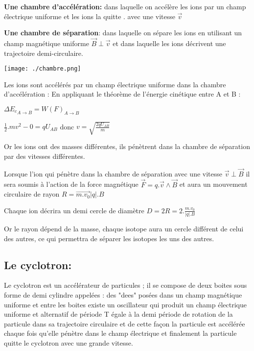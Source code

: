 \documentclass[12pt]{article}
\begin{document}
\textbf{Une chambre d'accélération:} dans laquelle on accélère les ions par un champ électrique uniforme et les ions la quitte
. avec une vitesse $\vec{v}$

\textbf{Une chambre de séparation}: dans laquelle on sépare les ions en utilisant un champ magnétique uniforme $\vec{B} \perp \vec{v} $  et dans laquelle les ions décrivent une trajectoire demi-circulaire.

	\begin{center}
			\texttt{[image: ./chambre.png]}
		\end{center}

Les ions sont accélérés par un champ électrique uniforme dans la chambre d'accélération :
En appliquant le théorème de l'énergie cinétique entre A et B :

 $\Delta{{E_c}_{A\rightarrow B}} = {{W(F)}_{A \rightarrow B}}$

 $\frac{1}{2}.mv^2 - 0 = qU_{AB}$ donc $v = \sqrt{\frac{2qU_{AB}}{m}}$

 Or les ions ont des masses différentes, ils pénètrent dans la chambre de séparation par des vitesses différentes.

 Lorsque l'ion qui pénètre dans la chambre de séparation avec une vitesse $\vec{v} \perp \vec{B}$ il sera soumis à l'action de la force magnétique $\vec{F} = q.\vec{v} \wedge \vec{B}$ et aura un mouvement circulaire de rayon $R = \vec{m.v_0}{|q|.B}$

 Chaque ion décrira un demi cercle de diamètre $D = 2R = 2.\frac{m.v_0}{|q|.B}$

 Or le rayon dépend de la masse, chaque isotope aura un cercle différent de celui des autres, ce qui permettra de
séparer les isotopes les uns des autres.

\subsection{Le cyclotron:}
Le cyclotron est un accélérateur de particules ; il se compose de deux boites sous forme de demi cylindre appelées :
des "dees" posées dans un champ magnétique uniforme et entre les boites existe un oscillateur qui produit un champ
électrique uniforme et alternatif de période T égale à la demi période de rotation de la particule dans sa trajectoire
circulaire et de cette façon la particule est accélérée chaque fois qu'elle pénètre dans le champ électrique et finalement
la particule quitte le cyclotron avec une grande vitesse.
\end{document}
